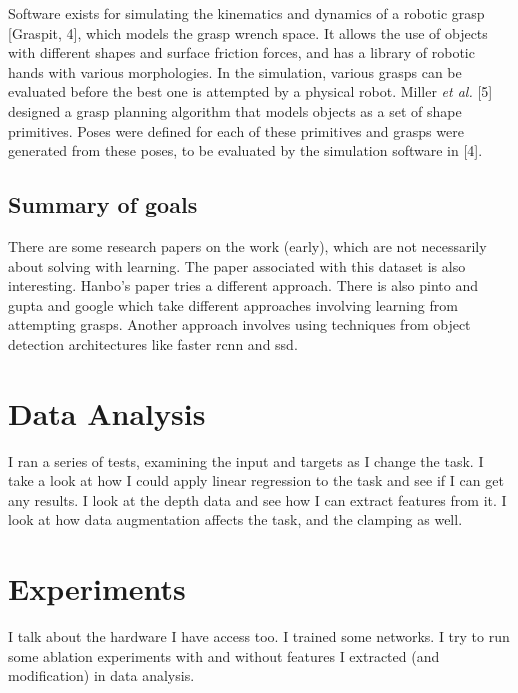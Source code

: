 \documentclass{article}
\begin{document}
Software exists for simulating the kinematics and dynamics of a robotic
grasp [Graspit, 4], which models the grasp wrench space. It allows the use
of objects with different shapes and surface friction forces, and has a library
of robotic hands with various morphologies. In the simulation, various grasps
can be evaluated before the best one is attempted by a physical robot. Miller
\textit{et al.} [5] designed a grasp planning algorithm that models objects as a
set of shape primitives. Poses were defined for each of these primitives and grasps
were generated from these poses, to be evaluated by the simulation software in [4].


\subsection{Summary of goals}
There are some research papers on the work (early), which are not necessarily
about solving with learning.
The paper associated with
this dataset is also interesting. Hanbo's paper tries a different approach.
There is also pinto and gupta and google which take different approaches
involving learning from attempting grasps. Another approach involves using
techniques from object detection architectures like faster rcnn and ssd.


\section{Data Analysis}
I ran a series of tests, examining the input and targets as I change the task.
I take a look at how I could apply linear regression to the task and see if
I can get any results. I look at the depth data and see how I can extract
features from it. I look at how data augmentation affects the task, and the
clamping as well.

\section{Experiments}
I talk about the hardware I have access too. I trained some networks. I try
to run some ablation experiments with and without features I extracted (and
modification) in data analysis.



\end{document}
